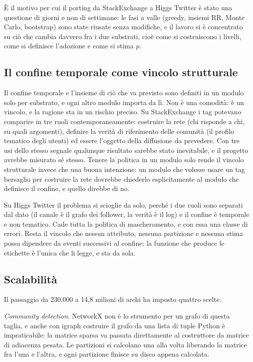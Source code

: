 \documentclass[11pt,a4paper]{article}
\newcommand{\sx}{StackExchange}
\newcommand{\hg}{Higgs Twitter}
\begin{document}
È il motivo per cui il porting da \sx{} a \hg{} è stato una questione di giorni e non di settimane: le fasi a valle (greedy, insiemi RR, Monte Carlo, bootstrap) sono state riusate senza modifiche, e il lavoro si è concentrato su ciò che cambia davvero fra i due substrati, cioè come si costruiscono i livelli, come si definisce l'adozione e come si stima $p$.

\subsection{Il confine temporale come vincolo strutturale}
Il confine temporale e l'insieme di ciò che va previsto sono definiti in un modulo solo per substrato, e ogni altro modulo importa da lì. Non è una comodità: è un vincolo, e la ragione sta in un rischio preciso. Su \sx{} i tag potevano comparire in tre ruoli contemporaneamente: costruire la rete (chi risponde a chi, su quali argomenti), definire la verità di riferimento delle comunità (il profilo tematico degli utenti) ed essere l'oggetto della diffusione da prevedere. Con tre usi dello stesso segnale qualunque risultato sarebbe stato inevitabile, e il progetto avrebbe misurato sé stesso. Tenere la politica in un modulo solo rende il vincolo strutturale invece che una buona intenzione: un modulo che volesse usare un tag bersaglio per costruire la rete dovrebbe chiederlo esplicitamente al modulo che definisce il confine, e quello direbbe di no.

Su \hg{} il problema si scioglie da solo, perché i due ruoli sono separati dal dato (il canale è il grafo dei follower, la verità è il log) e il confine è temporale e non tematico. Cade tutta la politica di mascheramento, e con essa una classe di errori. Resta il vincolo che nessun attributo, nessuna partizione e nessuna stima possa dipendere da eventi successivi al confine: la funzione che produce le etichette è l'unica che li legge, e sta da sola.

\subsection{Scalabilità}
Il passaggio da 230.000 a 14,8 milioni di archi ha imposto quattro scelte.

\emph{Community detection.} NetworkX non è lo strumento per un grafo di questa taglia, e anche con igraph costruire il grafo da una lista di tuple Python è impraticabile: la matrice sparsa va passata direttamente al costruttore da matrice di adiacenza pesata. Le partizioni si calcolano una alla volta liberando la matrice fra l'una e l'altra, e ogni partizione finisce su disco appena calcolata.
\end{document}
